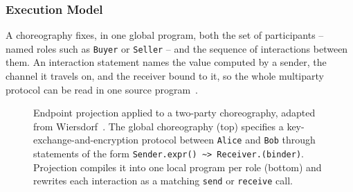 \subsubsection{Execution Model}
\label{subsubsec:choreography-execution-model}

A choreography fixes, in one global program, both the set of participants -- named roles such as \texttt{Buyer} or \texttt{Seller} -- and the sequence of interactions between them.
%
An interaction statement names the value computed by a sender, the channel it travels on, and the receiver bound to it,
so the whole multiparty protocol can be read in one source program~\cite{Montesi:2014}.

\begin{figure}
    \centering
    
    \caption[Endpoint projection applied to a two-party choreography]{Endpoint projection applied to a two-party choreography, adapted from Wiersdorf~\cite{wiersdorf2024chorex}.
    The global choreography (top) specifies a key-exchange-and-encryption protocol between \texttt{Alice} and \texttt{Bob} through statements of the form \texttt{Sender.expr() \textasciitilde> Receiver.(binder)}.
    Projection compiles it into one local program per role (bottom) and rewrites each interaction as a matching \texttt{send} or \texttt{receive} call.}
    \label{fig:epp}
\end{figure}

